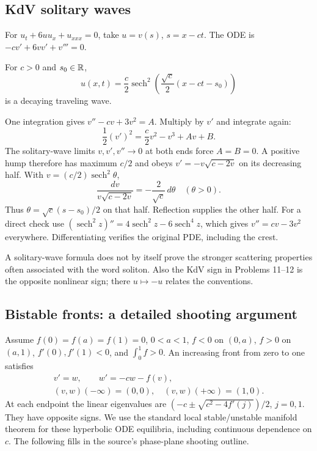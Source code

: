 \subsection{KdV solitary waves}
For $u_t+6uu_x+u_{xxx}=0$, take $u=v(s)$, $s=x-ct$.
The ODE is $-cv'+6vv'+v'''=0$.
\begin{theorem}
For $c>0$ and $s_0\in\mathbb{R}$,
\[
 u(x,t)=\frac c2\operatorname{sech}^2
             \left(\frac{\sqrt c}2(x-ct-s_0)\right)
\]
is a decaying traveling wave.
\end{theorem}
\begin{expandedproof}
One integration gives $v''-cv+3v^2=A$.
Multiply by $v'$ and integrate again:
\[
 \frac12(v')^2=\frac c2v^2-v^3+Av+B .
\]
The solitary-wave limits $v,v',v''\to0$ at both ends force $A=B=0$.
A positive hump therefore has maximum $c/2$ and obeys
$v'=-v\sqrt{c-2v}$ on its decreasing half.
With $v=(c/2)\operatorname{sech}^2\theta$,
\[
 \frac{dv}{v\sqrt{c-2v}}=-\frac2{\sqrt c}\,d\theta
 \quad(\theta>0).
\]
Thus $\theta=\sqrt c(s-s_0)/2$ on that half.
Reflection supplies the other half.
For a direct check use
$(\operatorname{sech}^2 z)''=4\operatorname{sech}^2z
-6\operatorname{sech}^4z$, which gives $v''=cv-3v^2$ everywhere.
Differentiating verifies the original PDE, including the crest.
\end{expandedproof}
\Needspace{45mm}
A solitary-wave formula does not by itself prove the stronger
scattering properties often associated with the word soliton.
Also the KdV sign in Problems 11--12 is the opposite nonlinear sign;
there $u\mapsto-u$ relates the conventions.

\Needspace{35mm}
\subsection{Bistable fronts: a detailed shooting argument}
Assume $f(0)=f(a)=f(1)=0$, $0<a<1$,
$f<0$ on $(0,a)$, $f>0$ on $(a,1)$,
$f'(0),f'(1)<0$, and $\int_0^1f>0$.
An increasing front from zero to one satisfies
\[
 \begin{gathered}
 v'=w,\qquad w'=-cw-f(v),\\
 (v,w)(-\infty)=(0,0),\quad(v,w)(+\infty)=(1,0).
 \end{gathered}
\]
At each endpoint the linear eigenvalues are
$(-c\pm\sqrt{c^2-4f'(j)})/2$, $j=0,1$.
They have opposite signs.
We use the standard local stable/unstable manifold theorem for these
hyperbolic ODE equilibria, including continuous dependence on $c$.
The following fills in the source's phase-plane shooting outline.


